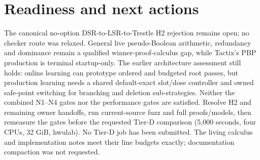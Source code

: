 \documentclass[11pt]{article}
\begin{document}
\section*{Readiness and next actions}
The canonical no-option DSR-to-LSR-to-Trestle H2 rejection remains open; no
checker route was relaxed. General live pseudo-Boolean arithmetic,
redundancy and dominance remain a qualified winner-proof-calculus gap, while
Tactix's PBP production is terminal startup-only. The earlier architecture
assessment still holds: online learning can prototype ordered and budgeted
root passes, but production learning needs a shared default-exact slot/dose
controller and owned safe-point switching for branching and deletion
sub-strategies. Neither the combined N1--N4 gates nor the performance gates
are satisfied. Resolve H2 and remaining owner handoffs, run current-source
fuzz and full proofs/models, then remeasure the gates before the requested
Tier-D comparison (5,000 seconds, four CPUs, 32 GiB, hwulab). No Tier-D job
has been submitted. The living calculus and implementation notes meet their
line budgets exactly; documentation compaction was not requested.
\end{document}
